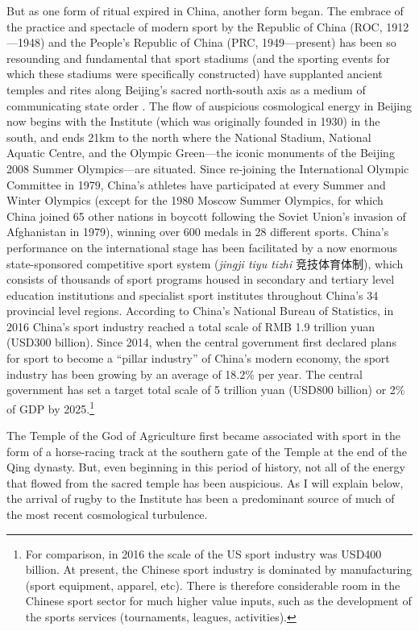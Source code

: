 \begin{CJK}{UTF8}{gbsn}
But as one form of ritual expired in China, another form began.
The embrace of the practice and spectacle of modern sport by the Republic of China (ROC, 1912---1948) and the People's Republic of China (PRC, 1949---present) has been so resounding and fundamental that sport stadiums (and the sporting events for which these stadiums were specifically constructed) have supplanted ancient temples and rites along Beijing's sacred north-south axis as a medium of communicating state order \citep{Brownell1995}.  The flow of auspicious cosmological energy in Beijing now begins with the Institute (which was originally founded in 1930) in the south, and ends 21km to the north where the National Stadium, National Aquatic Centre, and the Olympic Green---the iconic monuments of the Beijing 2008 Summer Olympics---are situated.  Since re-joining the International Olympic Committee in 1979, China's athletes have participated at every Summer and Winter Olympics (except for the 1980 Moscow Summer Olympics, for which China joined 65 other nations in boycott following the Soviet Union's invasion of Afghanistan in 1979), winning over 600 medals in 28 different sports.  China's performance on the international stage has been facilitated by a now enormous state-sponsored competitive sport system (\textit{jingji tiyu tizhi} 竞技体育体制), which consists of thousands of sport programs housed in secondary and tertiary level education institutions and specialist sport institutes throughout China's 34 provincial level regions.  According to China's National Bureau of Statistics, in 2016 China's sport industry reached a total scale of RMB 1.9 trillion yuan (USD300 billion).  Since 2014, when the central government first declared plans for sport to become a ``pillar industry'' of China's modern economy, the sport industry has been growing by an average of 18.2\% per year.  The central government has set a target total scale of 5 trillion yuan (USD800 billion) or 2\% of GDP by 2025.\footnote{For comparison, in 2016 the scale of the US sport industry was USD400 billion. At present, the Chinese sport industry is dominated by manufacturing (sport equipment, apparel, etc).  There is therefore considerable room in the Chinese sport sector for much higher value inputs, such as the development of the sports services (tournaments, leagues, activities).}

The Temple of the God of Agriculture first became associated with sport in the form of a horse-racing track at the southern gate of the Temple at the end of the Qing dynasty. But, even beginning in this period of history, not all of the energy that flowed from the sacred temple has been auspicious.  As I will explain below, the arrival of rugby to the Institute has been a predominant source of much of the most recent cosmological turbulence.


\end{CJK}

